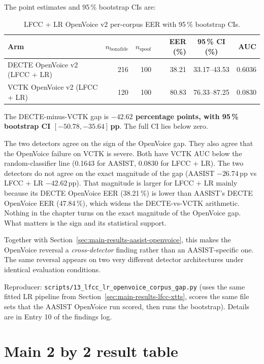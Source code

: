 The point estimates and 95\,\% bootstrap CIs are:

\begin{table}[t]
\centering
\caption{LFCC + LR OpenVoice v2 per-corpus EER with 95\,\% bootstrap CIs.}
\label{tab:main-results-lfcc-openvoice}
\begin{tabularx}{\linewidth}{X r r r c r}
\toprule
\textbf{Arm} & \textbf{$n_\text{bonafide}$} & \textbf{$n_\text{spoof}$} & \textbf{EER (\%)} & \textbf{95\,\% CI (\%)} & \textbf{AUC} \\
\midrule
DECTE OpenVoice v2 (LFCC + LR) & 216 & 100 & 38.21 & 33.17--43.53 & 0.6036 \\
VCTK OpenVoice v2 (LFCC + LR)  & 120 & 100 & 80.83 & 76.33--87.25 & 0.0830 \\
\bottomrule
\end{tabularx}
\end{table}

The DECTE-minus-VCTK gap is \textbf{$-42.62$ percentage points,
with 95\,\% bootstrap CI $[-50.78, -35.64]$\,pp}. The full CI lies
below zero.

The two detectors agree on the sign of the OpenVoice gap. They also
agree that the OpenVoice failure on VCTK is severe. Both have VCTK
AUC below the random-classifier line (0.1643 for AASIST, 0.0830 for
LFCC + LR). The two detectors do not agree on the exact magnitude
of the gap (AASIST $-26.74$\,pp vs LFCC + LR $-42.62$\,pp). That
magnitude is larger for LFCC + LR mainly because its DECTE
OpenVoice EER (38.21\,\%) is lower than AASIST's DECTE OpenVoice EER
(47.84\,\%), which widens the DECTE-vs-VCTK arithmetic. Nothing in
the chapter turns on the exact magnitude of the OpenVoice gap.
What matters is the sign and its statistical support.

Together with Section~\ref{sec:main-results-aasist-openvoice}, this
makes the OpenVoice reversal a \emph{cross-detector} finding rather
than an AASIST-specific one. The same reversal appears on two very
different detector architectures under identical evaluation
conditions.

Reproducer: \texttt{scripts/13\_lfcc\_lr\_openvoice\_corpus\_gap.py} (uses the
same fitted LR pipeline from Section~\ref{sec:main-results-lfcc-xtts}, scores the same file
sets that the AASIST OpenVoice run scored, then runs the bootstrap).
Details are in Entry 10 of the findings log.


\section{Main 2 by 2 result table}
\label{sec:main-results-combined}

